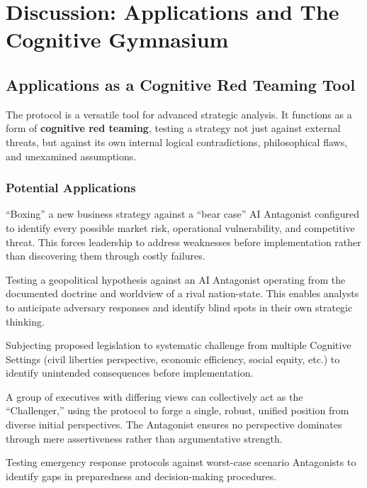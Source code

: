 \documentclass[11pt,a4paper]{article}
\begin{document}
\section{Discussion: Applications and The Cognitive Gymnasium}

\subsection{Applications as a Cognitive Red Teaming Tool}

The protocol is a versatile tool for advanced strategic analysis. It functions as a form of \textbf{cognitive red teaming}, testing a strategy not just against external threats, but against its own internal logical contradictions, philosophical flaws, and unexamined assumptions.

\subsubsection{Potential Applications}

\begin{description}[style=nextline, leftmargin=0pt]
\item[Corporate Strategy] ``Boxing'' a new business strategy against a ``bear case'' AI Antagonist configured to identify every possible market risk, operational vulnerability, and competitive threat. This forces leadership to address weaknesses before implementation rather than discovering them through costly failures.

\item[Intelligence Analysis] Testing a geopolitical hypothesis against an AI Antagonist operating from the documented doctrine and worldview of a rival nation-state. This enables analysts to anticipate adversary responses and identify blind spots in their own strategic thinking.

\item[Policy Formation] Subjecting proposed legislation to systematic challenge from multiple Cognitive Settings (civil liberties perspective, economic efficiency, social equity, etc.) to identify unintended consequences before implementation.

\item[Team Alignment] A group of executives with differing views can collectively act as the ``Challenger,'' using the protocol to forge a single, robust, unified position from diverse initial perspectives. The Antagonist ensures no perspective dominates through mere assertiveness rather than argumentative strength.

\item[Crisis Response Planning] Testing emergency response protocols against worst-case scenario Antagonists to identify gaps in preparedness and decision-making procedures.
\end{description}
\end{document}
